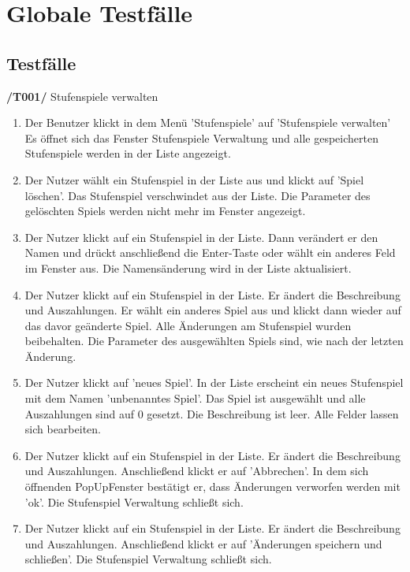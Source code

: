 \section{Globale Testfälle}

\subsection{Testfälle}

\textbf{/T001/} Stufenspiele verwalten
\begin{enumerate}

\item {}
{Der Benutzer klickt in dem Menü 'Stufenspiele' auf 'Stufenspiele verwalten'}
{Es öffnet sich das Fenster Stufenspiele Verwaltung und alle gespeicherten Stufenspiele werden in der Liste angezeigt.}

\item {}
{Der Nutzer wählt ein Stufenspiel in der Liste aus und klickt auf 'Spiel löschen'.}
{Das Stufenspiel verschwindet aus der Liste. Die Parameter des gelöschten Spiels werden nicht mehr im Fenster angezeigt.}

\item {}
{Der Nutzer klickt auf ein Stufenspiel in der Liste. Dann verändert er den Namen und drückt anschließend die Enter-Taste oder wählt ein anderes Feld im Fenster aus.}
{Die Namensänderung wird in der Liste aktualisiert. }

\item {}
{Der Nutzer klickt auf ein Stufenspiel in der Liste. Er ändert die Beschreibung und Auszahlungen. Er wählt ein anderes Spiel aus und klickt dann wieder auf das davor geänderte Spiel.}
{Alle Änderungen am Stufenspiel wurden beibehalten. Die Parameter des ausgewählten Spiels sind, wie nach der letzten Änderung.}

\item {}
{Der Nutzer klickt auf 'neues Spiel'.}
{In der Liste erscheint ein neues Stufenspiel mit dem Namen 'unbenanntes Spiel'. Das Spiel ist ausgewählt und alle Auszahlungen sind auf 0 gesetzt. Die Beschreibung ist leer. Alle Felder lassen sich bearbeiten.}

\item {}
{Der Nutzer klickt auf ein Stufenspiel in der Liste. Er ändert die Beschreibung und Auszahlungen. Anschließend klickt er auf 'Abbrechen'. In dem sich öffnenden PopUpFenster bestätigt er, dass Änderungen verworfen werden mit 'ok'.}
{Die Stufenspiel Verwaltung schließt sich.}

\item {}
{Der Nutzer klickt auf ein Stufenspiel in der Liste. Er ändert die Beschreibung und Auszahlungen. Anschließend klickt er auf 'Änderungen speichern und schließen'.}
{Die Stufenspiel Verwaltung schließt sich.}


\end{enumerate}

